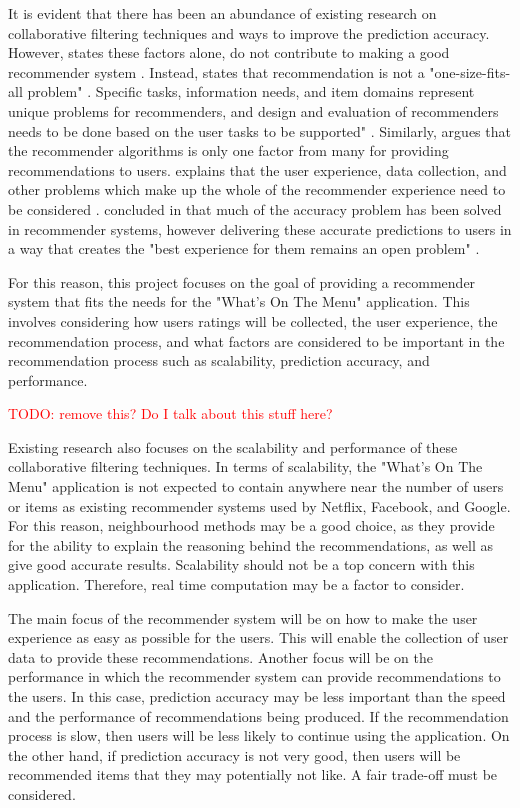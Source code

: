It is evident that there has been an abundance of existing research on collaborative filtering techniques and ways to improve the prediction accuracy. However, \citeauthor{schafer2007collaborative} states these factors alone, do not contribute to making a good recommender system \cite{schafer2007collaborative}. Instead, \citeauthor{schafer2007collaborative} states that recommendation is not a "one-size-fits-all problem"  \cite{schafer2007collaborative}. Specific tasks, information needs, and item domains represent unique problems for recommenders, and design and evaluation of recommenders needs to be done based on the user tasks to be supported" \cite{schafer2007collaborative}. Similarly, \citeauthor{martin2009recsys} argues that the recommender algorithms is only one factor from many for providing recommendations to users. \citeauthor{martin2009recsys} explains that the user experience, data collection, and other problems which make up the whole of the recommender experience need to be considered \cite{schafer2007collaborative, martin2009recsys}. \citeauthor{interface} concluded in \cite{interface} that much of the accuracy problem has been solved in recommender systems, however delivering these accurate predictions to users in a way that creates the "best experience for them remains an open problem" \cite{interface}. 

For this reason, this project focuses on the goal of providing a recommender system that fits the needs for the "What's On The Menu" application. This involves considering how users ratings will be collected, the user experience, the recommendation process, and what factors are considered to be important in the recommendation process such as scalability, prediction accuracy, and performance.

\textcolor{red}{TODO: remove this? Do I talk about this stuff here?}


Existing research also focuses on the scalability and performance of these collaborative filtering techniques. In terms of scalability, the "What's On The Menu" application is not expected to contain anywhere near the number of users or items as existing recommender systems used by Netflix, Facebook, and Google. For this reason, neighbourhood methods may be a good choice, as they provide for the ability to explain the reasoning behind the recommendations, as well as give good accurate results. Scalability should not be a top concern with this application. Therefore, real time computation may be a factor to consider. 

The main focus of the recommender system will be on how to make the user experience as easy as possible for the users. This will enable the collection of user data to provide these recommendations. Another focus will be on the performance in which the recommender system can provide recommendations to the users. In this case, prediction accuracy may be less important than the speed and the performance of recommendations being produced. If the recommendation process is slow, then users will be less likely to continue using the application. On the other hand, if prediction accuracy is not very good, then users will be recommended items that they may potentially not like. A fair trade-off must be considered. 

